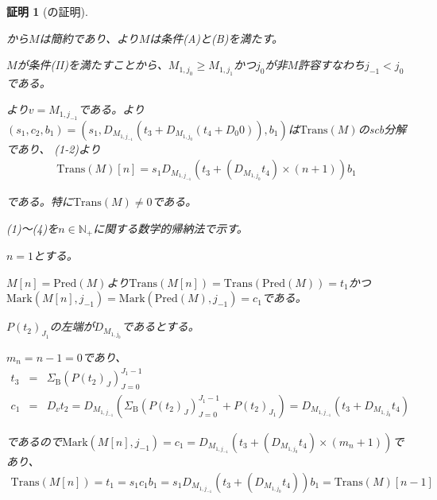 \documentclass[dvipdfmx,uplatex]{jsarticle}
\theoremstyle{customnonumberbreakfortheorem}
\theoremstyle{customnonumberbreakforproof}
\newtheorem{hideableproof}{証明}
\begin{document}
\begin{hideableproof}[の証明]
	\begin{indented}
		\item {}から\(M\)は簡約であり、より\(M\)は条件(A)と(B)を満たす。
		\item \(M\)が条件(II)を満たすことから、\(M_{1,j_0} \geq M_{1,j_1}\)かつ\(j_0\)が非\(M\)許容すなわち\(j_{-1} < j_0\)である。
		\item {}より\(v = M_{1,j_{-1}}\)である。より\((s_1,c_2,b_1) = (s_1,D_{M_{1,j_{-1}}}(t_3 + D_{M_{1,j_0}}(t_4 + D_0 0)),b_1)\)は\(\textrm{Trans}(M)\)のscb分解であり、 (1-2)より
		\begin{eqnarray*}
		\textrm{Trans}(M)[n] = s_1 D_{M_{1,j_{-1}}}(t_3 + (D_{M_{1,j_0}} t_4) \times (n+1)) b_1
		\end{eqnarray*}
		\item である。特に\(\textrm{Trans}(M) \neq 0\)である。
		\item
		\item (1)～(4)を\(n \in \mathbb{N}_{+}\)に関する数学的帰納法で示す。
		\item \(n=1\)とする。
		\begin{indented}
			\item \(M[n] = \textrm{Pred}(M)\)より\(\textrm{Trans}(M[n]) = \textrm{Trans}(\textrm{Pred}(M)) = t_1\)かつ\(\textrm{Mark}(M[n],j_{-1}) = \textrm{Mark}(\textrm{Pred}(M),j_{-1}) = c_1\)である。
			\item \(P(t_2)_{J_1}\)の左端が\(D_{M_{1,j_0}}\)であるとする。
			\begin{indented}
				\item \(m_n = n-1 = 0\)であり、
				\begin{eqnarray*}
				t_3 & = & \Sigma_{\textrm{B}} (P(t_2)_J)_{J=0}^{J_1-1} \\
				c_1 & = & D_v t_2 = D_{M_{1,j_{-1}}} (\Sigma_{\textrm{B}} (P(t_2)_J)_{J=0}^{J_1-1} + P(t_2)_{J_1}) = D_{M_{1,j_{-1}}} (t_3 + D_{M_{1,j_0}} t_4)
				\end{eqnarray*}
				\item であるので\(\textrm{Mark}(M[n],j_{-1}) = c_1 = D_{M_{1,j_{-1}}} (t_3 + (D_{M_{1,j_0}} t_4) \times (m_n+1))\)であり、
				\begin{eqnarray*}
				\textrm{Trans}(M[n]) = t_1 = s_1 c_1 b_1 = s_1 D_{M_{1,j_{-1}}} (t_3 + (D_{M_{1,j_0}} t_4)) b_1 = \textrm{Trans}(M)[n-1]
				\end{eqnarray*}

\end{indented}
\end{indented}
\end{indented}
\end{hideableproof}
\end{document}
